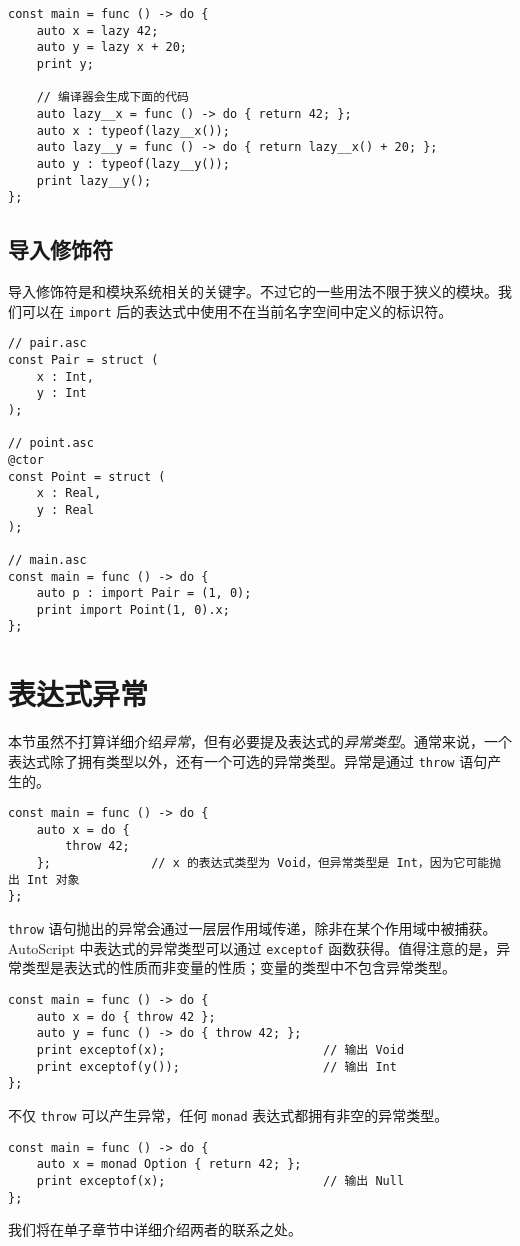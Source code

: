 \begin{lstlisting}
const main = func () -> do {
    auto x = lazy 42;
    auto y = lazy x + 20;
    print y;

    // 编译器会生成下面的代码
    auto lazy__x = func () -> do { return 42; };
    auto x : typeof(lazy__x());
    auto lazy__y = func () -> do { return lazy__x() + 20; };
    auto y : typeof(lazy__y());
    print lazy__y();    
};
\end{lstlisting}

\subsection{导入修饰符}

导入修饰符是和模块系统相关的关键字。不过它的一些用法不限于狭义的模块。我们可以在 \lstinline!import! 后的表达式中使用不在当前名字空间中定义的标识符。

\begin{lstlisting}
// pair.asc
const Pair = struct (
    x : Int,
    y : Int
);

// point.asc
@ctor
const Point = struct (
	x : Real,
	y : Real
);

// main.asc
const main = func () -> do {
	auto p : import Pair = (1, 0);
	print import Point(1, 0).x;
};
\end{lstlisting}


\section{表达式异常}

本节虽然不打算详细介绍\emph{异常}，但有必要提及表达式的\emph{异常类型}。通常来说，一个表达式除了拥有类型以外，还有一个可选的异常类型。异常是通过 \lstinline!throw! 语句产生的。

\begin{lstlisting}
const main = func () -> do {
    auto x = do {
        throw 42;
    };              // x 的表达式类型为 Void，但异常类型是 Int，因为它可能抛出 Int 对象
};
\end{lstlisting}

\lstinline!throw! 语句抛出的异常会通过一层层作用域传递，除非在某个作用域中被捕获。AutoScript 中表达式的异常类型可以通过 \lstinline!exceptof! 函数获得。值得注意的是，异常类型是表达式的性质而非变量的性质；变量的类型中不包含异常类型。

\begin{lstlisting}
const main = func () -> do {
    auto x = do { throw 42 };
    auto y = func () -> do { throw 42; };
    print exceptof(x);                      // 输出 Void
    print exceptof(y());                    // 输出 Int
};
\end{lstlisting}

不仅 \lstinline!throw! 可以产生异常，任何 \lstinline!monad! 表达式都拥有非空的异常类型。

\begin{lstlisting}
const main = func () -> do {
	auto x = monad Option { return 42; };
	print exceptof(x);						// 输出 Null
};
\end{lstlisting}

我们将在单子章节中详细介绍两者的联系之处。